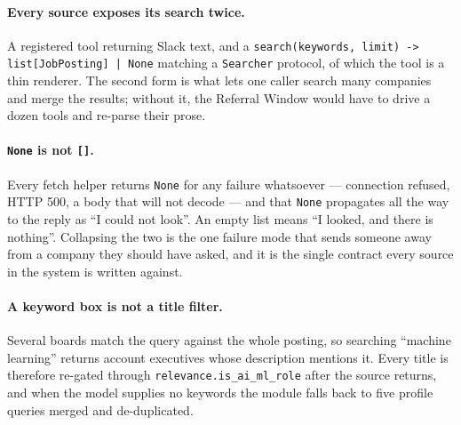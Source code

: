\documentclass[11pt,a4paper]{article}
\begin{document}
\paragraph{Every source exposes its search twice.} A registered tool returning Slack text,
and a \texttt{search(keywords, limit) -> list[JobPosting] | None} matching a
\texttt{Searcher} protocol, of which the tool is a thin renderer. The second form is what
lets one caller search many companies and merge the results; without it, the Referral Window
would have to drive a dozen tools and re-parse their prose.

\paragraph{\texttt{None} is not \texttt{[]}.} Every fetch helper returns \texttt{None} for
any failure whatsoever --- connection refused, HTTP 500, a body that will not decode --- and
that \texttt{None} propagates all the way to the reply as ``I could not look''. An empty list
means ``I looked, and there is nothing''. Collapsing the two is the one failure mode that
sends someone away from a company they should have asked, and it is the single contract
every source in the system is written against.

\paragraph{A keyword box is not a title filter.} Several boards match the query against the
whole posting, so searching ``machine learning'' returns account executives whose
description mentions it. Every title is therefore re-gated through
\texttt{relevance.is\_\allowbreak{}ai\_\allowbreak{}ml\_\allowbreak{}role} after the source returns, and when the model supplies no
keywords the module falls back to five profile queries merged and de-duplicated.
\end{document}
